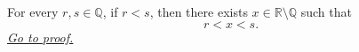 \begin{theorem}
\label{thm:irrational-between-any-two-rationals}
For every $r,s\in\mathbb{Q}$, if $r<s$, then there exists
$x\in\mathbb{R}\setminus\mathbb{Q}$ such that
\[
  r<x<s.
\]
\hyperref[prf:irrational-between-any-two-rationals]{\textit{Go to proof.}}
\end{theorem}
